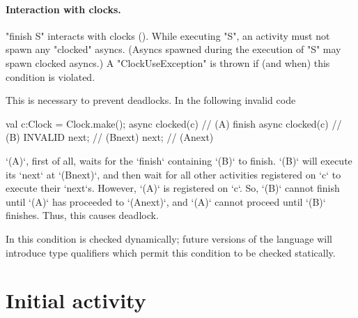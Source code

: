 \paragraph{Interaction with clocks.}\label{sec:finish:clock-rule}

\xcd"finish S" interacts with clocks (). 
While executing \xcd"S", an activity must not spawn any \xcd"clocked"
asyncs. (Asyncs spawned during the execution of \xcd"S" may spawn
clocked asyncs.) A
\xcd"ClockUseException" is thrown
if (and when) this condition is violated.

This is necessary to prevent deadlocks.  In the following invalid code 
\begin{xten}
val c:Clock = Clock.make();
async clocked(c) {                // (A) 
      finish async clocked(c) {   // (B) INVALID
            next;                 // (Bnext)
      }
      next;                       // (Anext)
}
\end{xten}
\xcd`(A)`, first of all, waits for the \xcd`finish` containing \xcd`(B)` to
finish.  
\xcd`(B)` will execute its \xcd`next` at \xcd`(Bnext)`, and then wait for all
other activities registered on \xcd`c` to execute their \xcd`next`s.
However, \xcd`(A)` is registered on \xcd`c`.  So, \xcd`(B)` cannot finish
until \xcd`(A)` has proceeded to \xcd`(Anext)`, and \xcd`(A)` cannot proceed
until \xcd`(B)` finishes. Thus, this causes deadlock.



In \XtenCurrVer{} this condition is checked dynamically; future
versions of the language will introduce type qualifiers which permit
this condition to be checked statically.



\section{Initial activity}\label{initial-computation}

